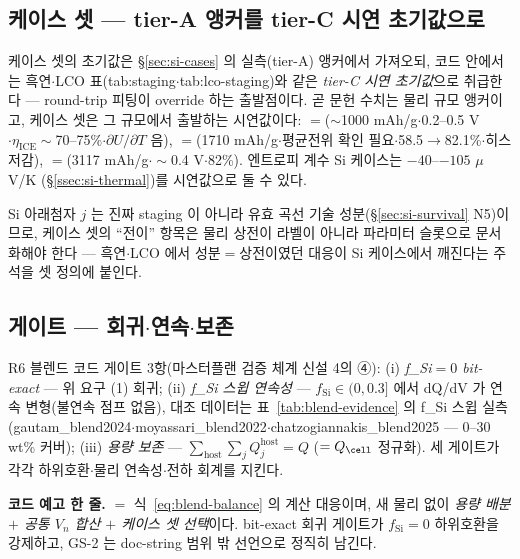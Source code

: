 \subsection{케이스 셋 --- tier-A 앵커를 tier-C 시연 초기값으로}\label{ssec:si-code-caseset}
케이스 셋의 초기값은 \S\ref{sec:si-cases} 의 실측(tier-A) 앵커에서 가져오되, 코드 안에서는 흑연$\cdot$LCO
표(tab:staging$\cdot$tab:lco-staging)와 같은 \emph{tier-C 시연 초기값}으로 취급한다 --- round-trip 피팅이
override 하는 출발점이다. 곧 문헌 수치는 물리 규모 앵커이고, 케이스 셋은 그 규모에서 출발하는 시연값이다:
$=$($\sim$1000 mAh/g$\cdot$0.2--0.5 V$\cdot\eta_\mathrm{ICE}\sim$70--75\%$\cdot\partial U/\partial T$ 음),
$=$(1710 mAh/g$\cdot$평균전위 확인 필요$\cdot$58.5$\to$82.1\%$\cdot$히스 저감),
$=$(3117 mAh/g$\cdot\sim$0.4 V$\cdot$82\%). 엔트로피 계수 Si 케이스는 $-40$--$-105$ $\mu$V/K
(\S\ref{ssec:si-thermal})를 시연값으로 둘 수 있다.
\begin{warnbox}
Si 아래첨자 $j$ 는 진짜 staging 이 아니라 유효 곡선 기술 성분(\S\ref{sec:si-survival} N5)이므로, 케이스
셋의 ``전이'' 항목은 물리 상전이 라벨이 아니라 파라미터 슬롯으로 문서화해야 한다 --- 흑연$\cdot$LCO 에서
성분$=$상전이였던 대응이 Si 케이스에서 깨진다는 주석을 셋 정의에 붙인다.
\end{warnbox}

\subsection{게이트 --- 회귀$\cdot$연속$\cdot$보존}\label{ssec:si-code-gate}
R6 블렌드 코드 게이트 3항(마스터플랜 검증 체계 신설 4의 ④): (i) \emph{f\_Si$=0$ bit-exact} --- 위 요구 (1)
회귀; (ii) \emph{f\_Si 스윕 연속성} --- $f_\mathrm{Si}\in(0,0.3]$ 에서 dQ/dV 가 연속 변형(불연속 점프
없음), 대조 데이터는 표~\ref{tab:blend-evidence} 의 f\_Si 스윕 실측(gautam\_blend2024$\cdot$moyassari\_blend2022$\cdot$chatzogiannakis\_blend2025
--- $0$--$30$ wt\% 커버); (iii) \emph{용량 보존} --- $\sum_{\mathrm{host}}\sum_jQ_j^{\mathrm{host}}=Q$
($=Q_\cell$ 정규화). 세 게이트가 각각 하위호환$\cdot$물리 연속성$\cdot$전하 회계를 지킨다.

\begin{keybox}
\textbf{코드 예고 한 줄.}  $=$ 식~\eqref{eq:blend-balance} 의 계산
대응이며, 새 물리 없이 \emph{용량 배분 $+$ 공통 $V_n$ 합산 $+$ 케이스 셋 선택}이다. bit-exact 회귀 게이트가
$f_\mathrm{Si}{=}0$ 하위호환을 강제하고, GS-2 는 doc-string 범위 밖 선언으로 정직히 남긴다.
\end{keybox}

